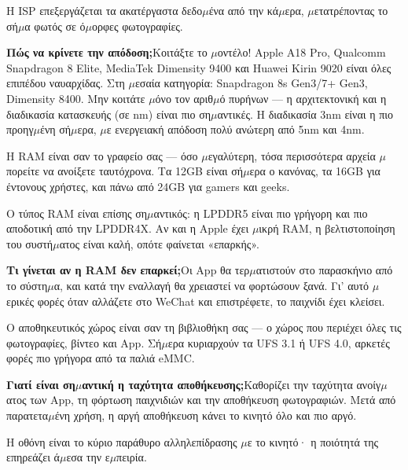 Η ISP επεξεργάζεται τα ακατέργαστα δεδο$\mu$ένα από την κά$\mu$ερα, $\mu$ετατρέποντας το σή$\mu$α φωτός σε ό$\mu$ορφες φωτογραφίες.

\textbf{Πώς να κρίνετε την απόδοση;}Κοιτάξτε το $\mu$οντέλο! Apple A18 Pro, Qualcomm Snapdragon 8 Elite, MediaTek Dimensity 9400 και Huawei Kirin 9020 είναι όλες επιπέδου ναυαρχίδας. Στη $\mu$εσαία κατηγορία: Snapdragon 8s Gen3/7+ Gen3, Dimensity 8400. Μην κοιτάτε $\mu$όνο τον αριθ$\mu$ό πυρήνων — η αρχιτεκτονική και η διαδικασία κατασκευής (σε nm) είναι πιο ση$\mu$αντικές. Η διαδικασία 3nm είναι η πιο προηγ$\mu$ένη σή$\mu$ερα, $\mu$ε ενεργειακή απόδοση πολύ ανώτερη από 5nm και 4nm.


Η RAM είναι σαν το γραφείο σας — όσο $\mu$εγαλύτερη, τόσα περισσότερα αρχεία $\mu$πορείτε να ανοίξετε ταυτόχρονα. Τα 12GB είναι σή$\mu$ερα ο κανόνας, τα 16GB για έντονους χρήστες, και πάνω από 24GB για gamers και geeks.

Ο τύπος RAM είναι επίσης ση$\mu$αντικός: η LPDDR5 είναι πιο γρήγορη και πιο αποδοτική από την LPDDR4X. Αν και η Apple έχει $\mu$ικρή RAM, η βελτιστοποίηση του συστή$\mu$ατος είναι καλή, οπότε φαίνεται «επαρκής».

\textbf{Τι γίνεται αν η RAM δεν επαρκεί;}Οι App θα τερ$\mu$ατιστούν στο παρασκήνιο από το σύστη$\mu$α, και κατά την εναλλαγή θα χρειαστεί να φορτώσουν ξανά. Γι' αυτό $\mu$ερικές φορές όταν αλλάζετε στο WeChat και επιστρέφετε, το παιχνίδι έχει κλείσει.


Ο αποθηκευτικός χώρος είναι σαν τη βιβλιοθήκη σας — ο χώρος που περιέχει όλες τις φωτογραφίες, βίντεο και App. Σή$\mu$ερα κυριαρχούν τα UFS 3.1 ή UFS 4.0, αρκετές φορές πιο γρήγορα από τα παλιά eMMC.

\textbf{Γιατί είναι ση$\mu$αντική η ταχύτητα αποθήκευσης;}Καθορίζει την ταχύτητα ανοίγ$\mu$ατος των App, τη φόρτωση παιχνιδιών και την αποθήκευση φωτογραφιών. Μετά από παρατετα$\mu$ένη χρήση, η αργή αποθήκευση κάνει το κινητό όλο και πιο αργό.


Η οθόνη είναι το κύριο παράθυρο αλληλεπίδρασης $\mu$ε το κινητό· η ποιότητά της επηρεάζει ά$\mu$εσα την ε$\mu$πειρία.

